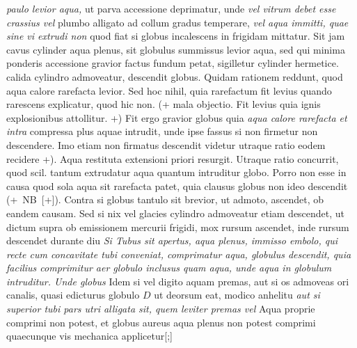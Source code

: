 \textit{paulo levior aqua,} ut parva accessione deprimatur, unde \textit{vel vitrum debet esse crassius vel} plumbo alligato ad collum gradus temperare, \textit{vel aqua immitti, quae sine vi extrudi non } quod fiat si globus incalescens in frigidam mittatur. Sit jam cavus cylinder aqua plenus, sit globulus summissus levior aqua, sed qui minima ponderis accessione gravior factus fundum petat, sigilletur cylinder hermetice.  calida cylindro admoveatur, descendit globus. Quidam rationem reddunt, quod aqua calore rarefacta levior. Sed hoc nihil, quia rarefactum fit levius quando rarescens explicatur, quod hic non. (+ mala objectio. Fit levius quia ignis explosionibus attollitur. +) Fit ergo gravior globus quia \textit{aqua calore rarefacta et intra } compressa plus aquae intrudit, unde   ipse fassus si non firmetur non descendere. Imo etiam non firmatus descendit videtur utraque ratio eodem recidere +). Aqua restituta extensioni priori resurgit. Utraque ratio concurrit, quod scil. tantum extrudatur aqua quantum intruditur globo. Porro non esse in causa quod sola aqua sit rarefacta patet, quia clausus globus non ideo descendit (+~NB~[+]). Contra si globus tantulo sit brevior, ut  admoto, ascendet, ob eandem causam. Sed si nix vel glacies cylindro admoveatur etiam descendet, ut dictum supra ob emissionem mercurii\protect{} frigidi, mox rursum ascendet, inde rursum descendet durante diu  
\textit{Si Tubus sit apertus, aqua plenus, immisso embolo,\protect{}
qui recte cum concavitate tubi conveniat, comprimatur aqua, globulus descendit,
quia facilius comprimitur aer globulo inclusus quam aqua, unde aqua in globulum intruditur.
Unde globus } Idem si vel digito aquam premas, aut si os\protect{} admoveas ori canalis, quasi edicturus globulo $D$ ut deorsum eat, modico anhelitu \textit{aut si superior tubi pars utri alligata sit, quem leviter premas vel } Aqua  proprie comprimi non potest, et globus aureus aqua plenus non potest comprimi quaecunque vis mechanica applicetur[;]
